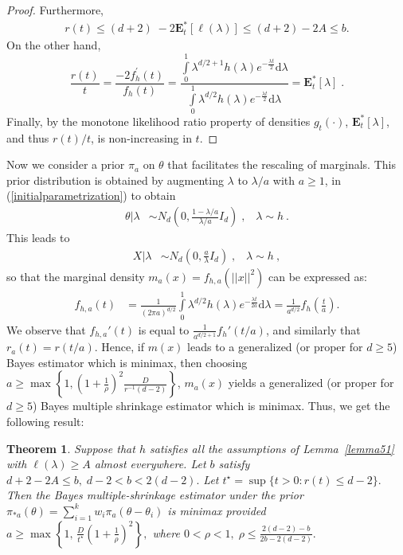 \documentclass[11pt]{article}
\newtheorem{theorem}{Theorem}
\theoremstyle{definition}
\begin{document}
\begin{proof}
Furthermore, 
\begin{align}
  \nonumber  r(t) \leq (d + 2 )\; - 2\mathbf{E}^{*}_t [\ell(\lambda) ]\leq ( d + 2) - 2A \leq b.
\end{align}
On the other hand,
\begin{equation}
    \nonumber \frac{r(t)}{t}  = \frac{-2f_h^{'}(t)}{f_h(t)} = \frac{\int\limits_{0}^1 \lambda^{d/2 + 1} h(\lambda) e^{-\frac{\lambda t}{2}} \text{d}\lambda}{\int\limits_{0}^1 \lambda^{d/2} h(\lambda) e^{-\frac{\lambda t}{2}} \text{d}\lambda} = \mathbf{E}^*_{t}[\lambda]\;.
\end{equation}
Finally, by the monotone likelihood ratio property of densities $g_t(\cdot)$,
$\mathbf{E}^*_{t}[\lambda]$, and thus $r(t)/t$, is non-increasing in $t$.
\end{proof}



Now we consider a prior $\pi_a$ on $\theta$ that facilitates the rescaling of marginals. This prior distribution is obtained by augmenting $\lambda$ to $\lambda/a$ with $a \geq 1$, in (\ref{initialparametrization}) to obtain
\begin{align}
   \theta | \lambda & \sim N_d\left(0, \frac{1 - \lambda/a}{\lambda/a}I_d\right)\;, \;\;\; \lambda \sim h\:.
\end{align}
This leads to 
\begin{align}
   \nonumber  X | \lambda & \sim N_d\left(0, \frac{a }{\lambda}I_d\right)\;, \;\;\; \lambda \sim h\:,
\end{align}
so that the marginal density $m_a(x) = f_{h,a}(||x||^2)$ can be expressed as\hspace{-1mm}:
\begin{align}
   \nonumber  f_{h,a}(t) &  = \frac{1}{(2\pi a)^{d/2}}\int\limits_{0}^1 \lambda^{d/2} h(\lambda) e^{-\frac{\lambda t}{2a}} \text{d}\lambda = \frac{1}{a^{d/2}} f_h\left(\frac{t}{a}\right).
\end{align}
We observe that $f_{h,a}'(t)$ is equal to $\frac{1}{a^{d/2+1}}f_{h}'(t/a)$, and similarly that $r_a(t) = r(t/a)$. 
Hence, if $m(x)$ leads to a generalized (or proper for $d \geq 5$) Bayes estimator which is minimax, then choosing $a \geq \max\left\{1, \left(1 + \frac{1}{\rho}\right)^2\frac{D}{r^{-1}(d-2)}\right\}$, $m_a(x)$ yields a generalized (or proper for $d \geq 5$) Bayes  multiple shrinkage estimator which is minimax.
 Thus, we get the following result\hspace{-1mm}:


\begin{theorem}
\label{thm:properBayesmultipleshrinkage}
Suppose that $h$ satisfies all the assumptions of
Lemma~\ref{lemma51} with
$\ell(\lambda)\geq A$ almost everywhere. Let $b$ satisfy $d+2-2A\leq b, \; d-2<b<2(d-2).$ Let $t^\star=\sup\{t>0:r(t)\leq d-2\}.$ Then the Bayes multiple-shrinkage estimator under the prior $\pi_{*a}(\theta)
=
\sum_{i=1}^k w_i\pi_a(\theta-\theta_i)$ is minimax provided $a\geq
\max\left\{
1,\,
\frac{D}{t^\star}
\left(1+\frac1\rho\right)^2
\right\},$ where $0<\rho<1,
\;
\rho\leq
\frac{2(d-2)-b}{2b-2(d-2)}.$
\end{theorem}
\end{document}
